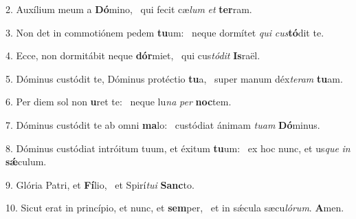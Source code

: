 2. Auxílium meum a \textbf{Dó}mino, \ast\  qui fecit cæ\textit{lum} \textit{et} \textbf{ter}ram.\

3. Non det in commotiónem pedem \textbf{tu}um: \ast\  neque dormítet \textit{qui} \textit{cus}\textbf{tó}dit te.\

4. Ecce, non dormitábit neque \textbf{dór}miet, \ast\  qui cus\textit{tó}\textit{dit} \textbf{Is}raël.\

5. Dóminus custódit te, Dóminus protéctio \textbf{tu}a, \ast\  super manum déx\textit{te}\textit{ram} \textbf{tu}am.\

6. Per diem sol non \textbf{u}ret te: \ast\  neque lu\textit{na} \textit{per} \textbf{noc}tem.\

7. Dóminus custódit te ab omni \textbf{ma}lo: \ast\  custódiat ánimam \textit{tu}\textit{am} \textbf{Dó}minus.\

8. Dóminus custódiat intróitum tuum, et éxitum \textbf{tu}um: \ast\  ex hoc nunc, et us\textit{que} \textit{in} \textbf{sǽ}culum.\

9. Glória Patri, et \textbf{Fí}lio, \ast\  et Spirí\textit{tu}\textit{i} \textbf{Sanc}to.\

10. Sicut erat in princípio, et nunc, et \textbf{sem}per, \ast\  et in sǽcula sæcu\textit{ló}\textit{rum}. \textbf{A}men.\


